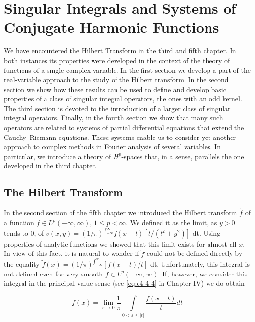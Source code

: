 \chapter{Singular Integrals and Systems of Conjugate Harmonic Functions}
\label{ch:c6}

We have encountered the Hilbert Transform in the third and fifth chapter. In both instances its properties were developed in the context of the theory of functions of a single complex variable. In the first section we develop a part of the real-variable approach to the study of the Hilbert transform. In the second section we show how these results can be used to define and develop basic properties of a class of singular integral operators, the ones with an odd kernel. The third section is devoted to the introduction of a larger class of singular integral operators. Finally, in the fourth section we show that many such operators are related to systems of partial differential equations that extend the Cauchy--Riemann equations. These systems enable us to consider yet another approach to complex methods in Fourier analysis of several variables. In particular, we introduce a theory of $H^{p}$-spaces that, in a sense, parallels the one developed in the third chapter.

\section{The Hilbert Transform}

In the second section of the fifth chapter we introduced the Hilbert transform $\tilde{f}$ of a function $f \in L^p(-\infty, \infty)$, $1 \leq p < \infty$. We defined it as the limit, as $y > 0$ tends to 0, of $v(x, y) = (1/\pi)^{\int_{-\infty}^{\infty}} f(x - t)[t/(t^2 + y^2)]$ dt. Using properties of analytic functions we showed that this limit exists for almost all $x$. In view of this fact, it is natural to wonder if $\tilde{f}$ could not be defined directly by the equality $\tilde{f}(x) = (1/\pi)^{\int_{-\infty}^{\infty}} [f(x - t)/t]$ dt. Unfortunately, this integral is not defined even for very smooth $f \in L^p(-\infty, \infty)$. If, however, we consider this integral in the principal value sense (see \eqref{eq:c4-4-4} in Chapter IV) we do obtain

\begin{equation}\label{eq:c6-1-1}
\tilde{f}(x)=\lim_{\varepsilon\to0}\frac{1}{\pi}\int\limits_{0<\varepsilon\leq|t|}\frac{f(x-t)}{t}dt
\end{equation}

